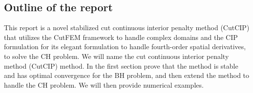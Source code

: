 \subsection{Outline of the report}%
\label{sub:outline_of_the_report}

This report is a novel stabilized cut continuous interior penalty method (CutCIP) that utilizes the CutFEM framework to handle complex domains and the CIP formulation for its elegant formulation to handle fourth-order spatial derivatives, to solve
the CH problem. We will name the cut continuous interior penalty method (CutCIP) method. In the first section prove that the method is stable and has optimal
convergence for the BH problem, and then extend the method to handle the CH problem. We will then provide numerical examples.
